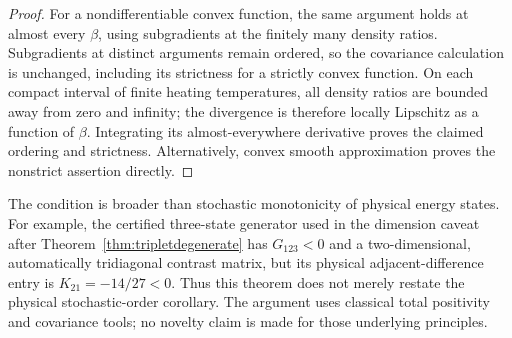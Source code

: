 \begin{proof}
For a nondifferentiable convex function, the same argument holds at
almost every $\beta$, using subgradients at the finitely many density
ratios. Subgradients at distinct arguments remain ordered, so the
covariance calculation is unchanged, including its strictness for a
strictly convex function. On each compact interval of finite heating
temperatures, all density ratios are bounded away from zero and infinity;
the divergence is therefore locally Lipschitz as a function of $\beta$.
Integrating its almost-everywhere derivative proves the claimed ordering
and strictness. Alternatively, convex smooth approximation proves the
nonstrict assertion directly.
\end{proof}

The condition is broader than stochastic monotonicity of physical
energy states. For example, the certified three-state generator used
in the dimension caveat after Theorem~\ref{thm:tripletdegenerate} has
$G_{123}<0$ and a two-dimensional, automatically tridiagonal contrast
matrix, but its physical adjacent-difference entry is
$K_{21}=-14/27<0$. Thus this theorem does not merely restate the
physical stochastic-order corollary. The argument uses classical total
positivity and covariance tools; no novelty claim is made for those
underlying principles.
